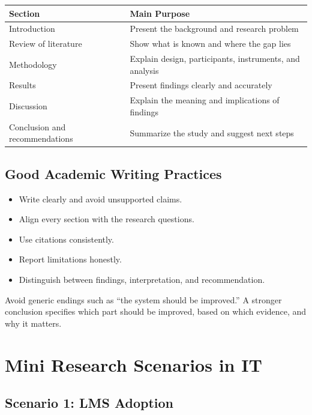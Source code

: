 \documentclass[11pt,a4paper]{article}
\begin{document}
\begin{longtable}{L{3.1cm}L{8.3cm}}
\toprule
\textbf{Section} & \textbf{Main Purpose} \\
\midrule
Introduction & Present the background and research problem \\
Review of literature & Show what is known and where the gap lies \\
Methodology & Explain design, participants, instruments, and analysis \\
Results & Present findings clearly and accurately \\
Discussion & Explain the meaning and implications of findings \\
Conclusion and recommendations & Summarize the study and suggest next steps \\
\bottomrule
\end{longtable}

\subsection{Good Academic Writing Practices}

\begin{itemize}[leftmargin=*]
  \item Write clearly and avoid unsupported claims.
  \item Align every section with the research questions.
  \item Use citations consistently.
  \item Report limitations honestly.
  \item Distinguish between findings, interpretation, and recommendation.
\end{itemize}

\begin{alertbox}
Avoid generic endings such as ``the system should be improved.'' A stronger conclusion specifies which part should be improved, based on which evidence, and why it matters.
\end{alertbox}

\section{Mini Research Scenarios in IT}

\subsection{Scenario 1: LMS Adoption}
\end{document}
